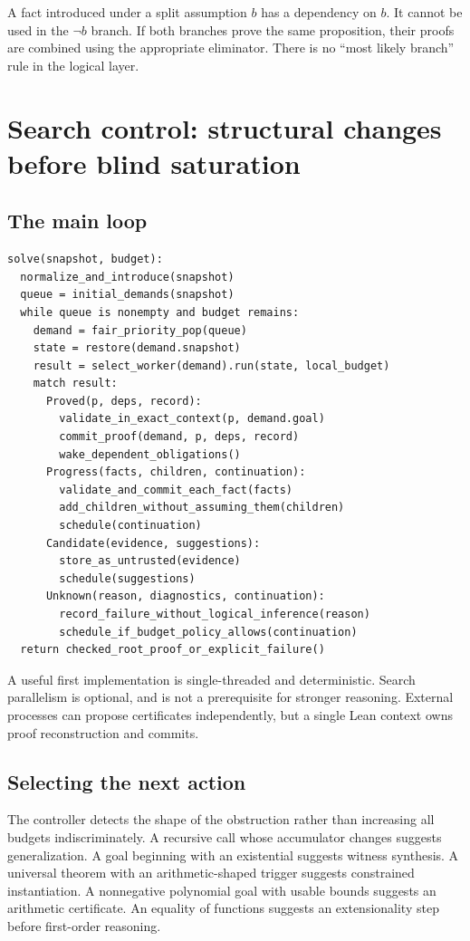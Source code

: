 A fact introduced under a split assumption $b$ has a dependency on $b$.
It cannot be used in the $\neg b$ branch. If both branches prove the same
proposition, their proofs are combined using the appropriate eliminator.
There is no ``most likely branch'' rule in the logical layer.

\section{Search control: structural changes before blind saturation}

\subsection{The main loop}

\begin{lstlisting}
solve(snapshot, budget):
  normalize_and_introduce(snapshot)
  queue = initial_demands(snapshot)
  while queue is nonempty and budget remains:
    demand = fair_priority_pop(queue)
    state = restore(demand.snapshot)
    result = select_worker(demand).run(state, local_budget)
    match result:
      Proved(p, deps, record):
        validate_in_exact_context(p, demand.goal)
        commit_proof(demand, p, deps, record)
        wake_dependent_obligations()
      Progress(facts, children, continuation):
        validate_and_commit_each_fact(facts)
        add_children_without_assuming_them(children)
        schedule(continuation)
      Candidate(evidence, suggestions):
        store_as_untrusted(evidence)
        schedule(suggestions)
      Unknown(reason, diagnostics, continuation):
        record_failure_without_logical_inference(reason)
        schedule_if_budget_policy_allows(continuation)
  return checked_root_proof_or_explicit_failure()
\end{lstlisting}

A useful first implementation is single-threaded and deterministic. Search
parallelism is optional, and is not a prerequisite for stronger reasoning.
External processes can propose certificates independently, but a single Lean
context owns proof reconstruction and commits.

\subsection{Selecting the next action}

The controller detects the shape of the obstruction rather than increasing
all budgets indiscriminately. A recursive call whose accumulator changes
suggests generalization. A goal beginning with an existential suggests witness
synthesis. A universal theorem with an arithmetic-shaped trigger suggests
constrained instantiation. A nonnegative polynomial goal with usable bounds
suggests an arithmetic certificate. An equality of functions suggests an
extensionality step before first-order reasoning.

